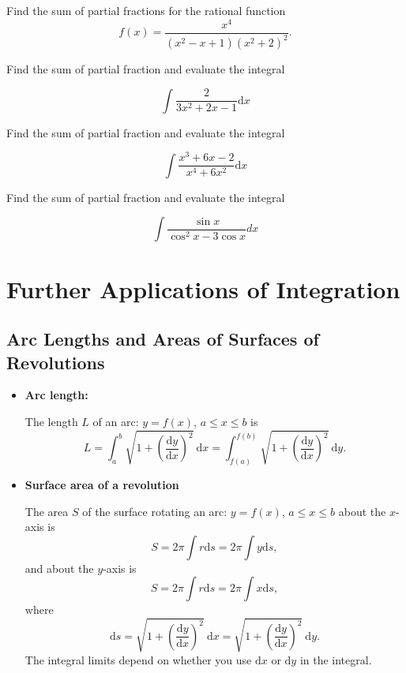 \documentclass[en,11pt,simple]{elegantbook}
\let\BeginKnitrBlock\begin \let\EndKnitrBlock\end
\begin{document}
\BeginKnitrBlock{exercise}{}{}
\protect\hypertarget{exr:unnamed-chunk-210}{}{\label{exr:unnamed-chunk-210} }
Find the sum of partial fractions for the rational function
\[
f(x)=\frac{x^{4}}{\left(x^{2}-x+1\right)\left(x^{2}+2\right)^{2}}.
\]
\EndKnitrBlock{exercise}

\BeginKnitrBlock{exercise}{}{}
\protect\hypertarget{exr:unnamed-chunk-211}{}{\label{exr:unnamed-chunk-211} }
Find the sum of partial fraction and evaluate the integral

\[
\int \frac{2}{3x^{2}+2x-1} \mathrm{d} x
\]
\EndKnitrBlock{exercise}

\BeginKnitrBlock{exercise}{}{}
\protect\hypertarget{exr:unnamed-chunk-212}{}{\label{exr:unnamed-chunk-212} }
Find the sum of partial fraction and evaluate the integral

\[
\int \frac{x^{3}+6 x-2}{x^{4}+6 x^{2}} \mathrm{d} x
\]
\EndKnitrBlock{exercise}

\BeginKnitrBlock{exercise}{}{}
\protect\hypertarget{exr:unnamed-chunk-213}{}{\label{exr:unnamed-chunk-213} }
Find the sum of partial fraction and evaluate the integral

\[
\int \frac{\sin x}{\cos ^{2} x-3 \cos x} d x
\]
\EndKnitrBlock{exercise}

\hypertarget{further-applications-of-integration}{%
\chapter{Further Applications of Integration}\label{further-applications-of-integration}}

\hypertarget{arc-lengths-and-areas-of-surfaces-of-revolutions}{%
\section{Arc Lengths and Areas of Surfaces of Revolutions}\label{arc-lengths-and-areas-of-surfaces-of-revolutions}}

\begin{itemize}
\item
  \textbf{Arc length:}

  The length \(L\) of an arc: \(y=f(x)\), \(a\leq x \leq b\) is
  \[
  L=\int_a^b\sqrt{1+\left(\frac{\mathrm{d} y}{\mathrm{d} x}\right)^2}~\mathrm{d} x=\int_{f(a)}^{f(b)}\sqrt{1+\left(\frac{\mathrm{d} y}{\mathrm{d} x}\right)^2}~\mathrm{d} y.
  \]
\item
  \textbf{Surface area of a revolution}

  The area \(S\) of the surface rotating an arc: \(y=f(x)\), \(a\leq x \leq b\) about the \(x\)-axis is
  \[
  S=2\pi\int r\mathrm{d} s = 2\pi\int y\mathrm{d} s,
  \]
  and about the \(y\)-axis is
  \[
  S=2\pi\int r\mathrm{d} s = 2\pi\int x\mathrm{d} s,
  \]
  where
  \[\mathrm{d} s=\sqrt{1+\left(\frac{\mathrm{d} y}{\mathrm{d} x}\right)^2}~\mathrm{d} x = \sqrt{1+\left(\frac{\mathrm{d} y}{\mathrm{d} x}\right)^2}~\mathrm{d} y.
  \]
  The integral limits depend on whether you use \(\mathrm{d} x\) or \(\mathrm{d}y\) in the integral.
\end{itemize}
\end{document}
